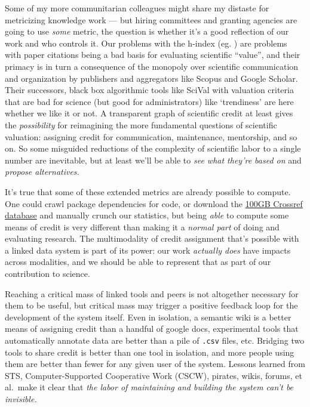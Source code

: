 \documentclass[10pt]{article}
\begin{document}
\begin{multicols}{2}
Some of my more communitarian colleagues might share my distaste for
metricizing knowledge work --- but hiring committees and granting
agencies are going to use \emph{some} metric, the question is whether
it's a good reflection of our work and who controls it. Our problems
with the h-index (eg. \cite{teixeiradasilvaMultipleVersionsHindex2018, costasReflectionsCautionaryUse2018} ) are problems with paper
citations being a bad basis for evaluating scientific ``value'', and
their primacy is in turn a consequence of the monopoly over scientific
communication and organization by publishers and aggregators like Scopus
and Google Scholar. Their successors, black box algorithmic tools like
SciVal with valuation criteria that are bad for science (but good for
administrators) like `trendiness' are here whether we like it or not. A
transparent graph of scientific credit at least gives the
\emph{possibility} for reimagining the more fundamental questions of
scientific valuation: assigning credit for communication, maintenance,
mentorship, and so on. So some misguided reductions of the complexity of
scientific labor to a single number are inevitable, but at least we'll
be able to \emph{see what they're based on} and \emph{propose
alternatives.}

It's true that some of these extended metrics are already possible to
compute. One could crawl package dependencies for code, or download the
\href{https://academictorrents.com/details/e4287cb7619999709f6e9db5c359dda17e93d515}{100GB
Crossref database} \cite{crossrefJanuary2021Public2021}  and
manually crunch our statistics, but being \emph{able} to compute some
means of credit is very different than making it a \emph{normal part} of
doing and evaluating research. The multimodality of credit assignment
that's possible with a linked data system is part of its power: our work
\emph{actually does} have impacts across modalities, and we should be
able to represent that as part of our contribution to science.

Reaching a critical mass of linked tools and peers is not altogether
necessary for them to be useful, but critical mass may trigger a
positive feedback loop for the development of the system itself. Even in
isolation, a semantic wiki is a better means of assigning credit than a
handful of google docs, experimental tools that automatically annotate
data are better than a pile of \texttt{.csv} files, etc. Bridging two
tools to share credit is better than one tool in isolation, and more
people using them are better than fewer for any given user of the
system. Lessons learned from STS, Computer-Supported Cooperative Work
(CSCW), pirates, wikis, forums, et al.~make it clear that \emph{the
labor of maintaining and building the system can't be invisible.}


\end{multicols}
\end{document}
